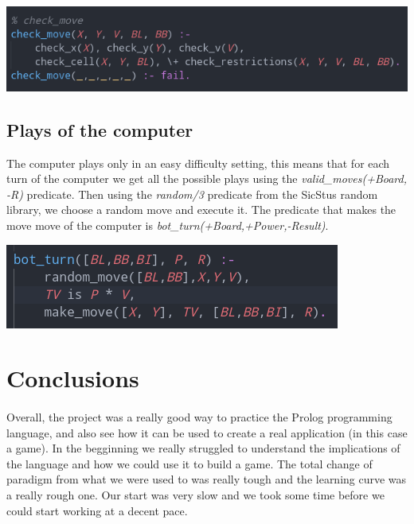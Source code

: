 \documentclass[a4paper]{article}
\begin{document}
\begin{center}
    \includegraphics[scale=0.4]{img/check_move.png}
\end{center}

\subsection{Plays of the computer} 
The computer plays only in an easy difficulty setting, this means that for each turn of the computer we get all the possible plays using 
the \textit{valid\_moves(+Board, -R)} predicate. Then using the \textit{random/3} predicate from the SicStus random library, we choose a random 
move and execute it. The predicate that makes the move move of the computer is \textit{bot\_turn(+Board,+Power,-Result)}.

\begin{center}
    \includegraphics[scale=0.4]{img/bot_move.png}
\end{center}


\pagebreak
\section{Conclusions}

\paragraph{}
Overall, the project was a really good way to practice the Prolog programming language, and
also see how it can be used to create a real application (in this case a game). In the 
begginning we really struggled to understand the implications of the language and how 
we could use it to build a game. The total change of paradigm from what we were used to 
was really tough and the learning curve was a really rough one. Our start was very slow 
and we took some time before we could start working at a decent pace.
\end{document}
